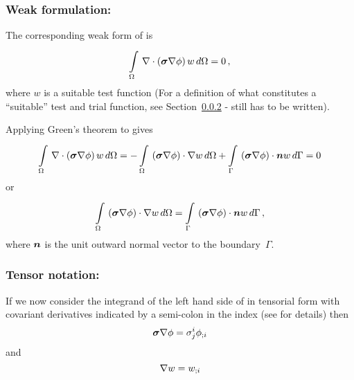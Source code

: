 \subsubsection{Weak formulation:}
The corresponding weak form of  is
\begin{equation}
    \displaystyle\int\limits_{\Omega}^{} \, \nabla\cdot\left( \boldsymbol{\sigma}\nabla \phi \right) w\,d\Omega =0 \,,
  \label{eqn:Laplaceweakform}
\end{equation}
where $w$ is a suitable test function 
(For a definition of what constitutes a ``suitable'' test and trial function,
see Section~\ref{} - still has to be written).

Applying Green's theorem to  gives
\begin{equation}
 \gint{\Omega}{}{\diverg{\pbrac{\tensor{\sigma}\gradient{\phi}}}w}{\Omega}
 = -\gint{\Omega}{}{\dotprod{\pbrac{\tensor{\sigma}\gradient{\phi}}}{\gradient{w}}}{\Omega}
   +\gint{\Gamma}{}{\dotprod{\pbrac{\tensor{\sigma}\gradient{\phi}}}{\vect{n}}w}{\Gamma}
 = 0
\end{equation}
or
\begin{equation}
  \gint{\Omega}{}{\dotprod{\pbrac{\tensor{\sigma}\gradient{\phi}}}{\gradient{w}}}{\Omega}
  = \gint{\Gamma}{}{\dotprod{\pbrac{\tensor{\sigma}\gradient{\phi}}}{\vect{n}w}}{\Gamma} \,,
  \label{eqn:Laplaceweightedresidualform}
\end{equation}
where $\vect{n}$ is the unit outward normal vector to the boundary~$\Gamma$.

\subsubsection{Tensor notation:}
If we now consider the integrand of the left hand side of
 in tensorial form with covariant
derivatives indicated by a semi-colon in the index
(see  for details) then
\begin{equation}
  \boldsymbol{\sigma}\nabla \phi = \sigma^{i}_{j} {\phi}_{;i} 
  \label{eqn:Laplace weak form factor1}
\end{equation}
and
\begin{equation}
  \nabla w =  {w}_{;i} 
  \label{eqn:Laplace weak form factor2}
\end{equation}

